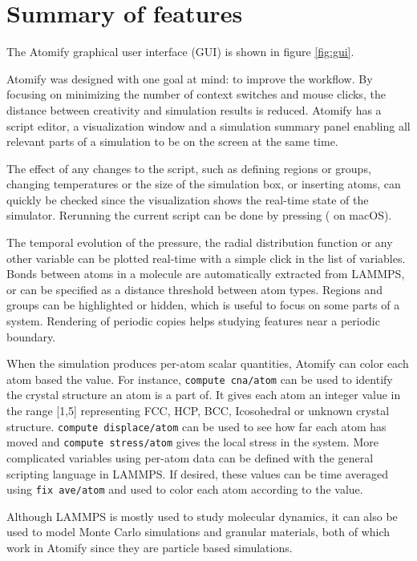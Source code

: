 \documentclass[12pt,a4paper,final]{iopart}
\newcommand{\code}[1]{\colorbox{light-gray}{\color{RawSienna}\texttt{#1}}}
\begin{document}
\section{\label{sec:features}Summary of features}
The Atomify graphical user interface (GUI) is shown in figure \ref{fig:gui}.

Atomify was designed with one goal at mind: to improve the workflow.
By focusing on minimizing the number of context switches and mouse clicks, 
the distance between creativity and simulation results is reduced. 
Atomify has a script editor, a visualization window and a simulation summary panel enabling all relevant parts
of a simulation to be on the screen at the same time.

The effect of any changes to the script, such as defining regions or groups,
changing temperatures or the size of the simulation box, or inserting atoms, can
quickly be checked since the visualization shows the real-time state of the simulator.
Rerunning the current script can be done by pressing  ( on macOS).

The temporal evolution of the pressure, the radial distribution function or any other
variable can be plotted real-time with a simple click in the list of variables.
Bonds between atoms in a molecule are automatically extracted from LAMMPS, or can
be specified as a distance threshold between atom types.
Regions and groups can be highlighted or hidden, which is useful to focus on some parts of a system.
Rendering of periodic copies helps studying features near a periodic boundary.

When the simulation produces per-atom scalar quantities, Atomify can color each atom based the value.
For instance, \code{compute cna/atom}\cite{faken1994systematic, tsuzuki2007structural} can be used to identify the crystal structure an atom is a part of.
It gives each atom an integer value in the range [1,5] representing FCC, HCP, BCC, Icosohedral or unknown crystal structure.
\code{compute displace/atom} can be used to see how far each atom has moved and \code{compute stress/atom} gives the local stress in the system.
More complicated variables using per-atom data can be defined with the general scripting language in LAMMPS.
If desired, these values can be time averaged using \code{fix ave/atom} and used to color each atom according to the value.

Although LAMMPS is mostly used to study molecular dynamics, it can also be used to
model Monte Carlo simulations\cite{frenkel2001understanding} and granular
materials\cite{brilliantov1996model, silbert2001granular, zhang2005jamming},
both of which work in Atomify since they are particle based simulations.
\end{document}
